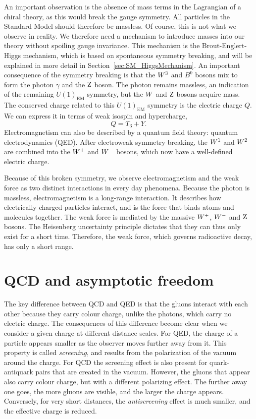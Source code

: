 An important observation is the absence of mass terms in the Lagrangian of a chiral
theory, as this would break the gauge symmetry. All particles in the Standard Model should therefore
be massless.
Of course, this is not what we observe in reality. 
We therefore need a mechanism to introduce masses into our theory without spoiling gauge
invariance. This mechanism is the Brout-Englert-Higgs mechanism, which is based on spontaneous
symmetry breaking, and will be explained in more detail in Section~\ref{sec:SM_HiggsMechanism}.
An important consequence of the symmetry breaking is that the $W^3$ and $B^0$ bosons mix to
form the photon $\gamma$ and the $\mathrm{Z}$ boson. 
The photon remains massless, an indication of the remaining $U(1)_{\text{EM}}$ symmetry,
but the $W$ and $\mathrm{Z}$ bosons acquire mass. 
The conserved charge related to this $U(1)_{\text{EM}}$ symmetry is the electric charge $Q$. We can
express it in terms of weak isospin and hypercharge,
\begin{equation}
  Q = T_3 + Y .
\end{equation}
Electromagnetism can also be described by a quantum field theory: quantum electrodynamics (QED).
After electroweak symmetry breaking, the $W^1$ and $W^2$ are combined into the $W^+$ and $W^-$
bosons, which now have a well-defined electric charge. 

Because of this broken symmetry, we observe electromagnetism and the weak force as two distinct
interactions in every day phenomena. 
Because the photon is massless, electromagnetism is a long-range interaction. It describes how
electrically charged particles interact, and is the force that binds atoms and molecules together.
The weak force is mediated by the massive $W^+$, $W^-$ and $\mathrm{Z}$ bosons.
The Heisenberg uncertainty principle dictates that they can thus only exist for a short time.
Therefore, the weak force, which governs radioactive decay, has only a short range.



\section{QCD and asymptotic freedom \label{sec:SM_QCD}}

The key difference between QCD and QED is that the gluons interact with each other because they
carry colour charge, unlike the photons, which carry no electric charge. The consequences of this
difference become clear when we consider a given charge at different distance scales. 
For QED, the charge of a particle appears smaller as the observer moves further away from it.
This property is called \textit{screening}, and results from the polarization of the vacuum around
the charge. 
For QCD the screening effect is also present for quark-antiquark pairs that are created in the
vacuum. However, the gluons that appear also carry colour charge, but with a different polarizing
effect. The further away one goes, the more gluons are visible, and the larger the charge appears.
Conversely, for very short distances, the \textit{antiscreening} effect is much smaller, and the
effective charge is reduced. 

